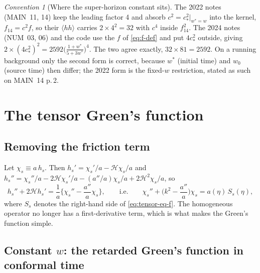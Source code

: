 \documentclass[11pt,a4paper]{article}
\newcommand{\cH}{\mathcal{H}}
\newcommand{\wstar}{w^{*}}
\newcommand{\cstar}{c_{*}}
\newcommand{\note}[1]{\textsf{#1}}
\theoremstyle{remark}
\newtheorem*{convention}{Convention}
\begin{document}
\begin{convention}[Where the super-horizon constant sits]
The 2022 notes (\note{MAIN}~11, 14) keep the leading factor 4 and absorb $c^2 = \cstar^2|_{\wstar=w}$ into the kernel, $f_{14} = c^2f$, so their $\langle hh\rangle$ carries $2\times4^2 = 32$ with $c^4$ inside $f_{14}^2$. The 2024 notes (\note{NUM}~03, 06) and the code use the $f$ of \eqref{eq:f-def} and put $4\cstar^2$ outside, giving $2\times(4\cstar^2)^2 = 2592\big(\tfrac{1+\wstar}{5+3\wstar}\big)^4$. The two agree exactly, $32\times81 = 2592$. On a running background only the second form is correct, because $\wstar$ (initial time) and $w_0$ (source time) then differ; the 2022 form is the fixed-$w$ restriction, stated as such on \note{MAIN}~14 p.\,2.
\end{convention}

\section{The tensor Green's function}
\label{sec:greens}

\subsection{Removing the friction term}

Let $\chi_s\equiv a\,h_s$. Then $h_s' = \chi_s'/a - \cH\chi_s/a$ and $h_s'' = \chi_s''/a - 2\cH\chi_s'/a - (a''/a)\chi_s/a + 2\cH^2\chi_s/a$, so
\begin{equation}
h_s'' + 2\cH h_s' = \frac{1}{a}\Big\{\chi_s'' - \frac{a''}{a}\chi_s\Big\},
\qquad\text{i.e.}\qquad
\chi_s'' + \Big(k^2 - \frac{a''}{a}\Big)\chi_s = a(\eta)\,S_s(\eta),
\label{eq:chi-eq}
\end{equation}
where $S_s$ denotes the right-hand side of \eqref{eq:tensor-eq-f}. The homogeneous operator no longer has a first-derivative term, which is what makes the Green's function simple.

\subsection{Constant \texorpdfstring{$w$}{w}: the retarded Green's function in conformal time}
\label{sec:Gr-analytic}
\end{document}
